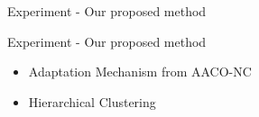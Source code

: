 \documentclass[aspectratio=169]{beamer}
\begin{document}
%          
    

\begin{frame}{Experiment - Our proposed method}
\vspace{0.15cm}
\centering

\end{frame}

\begin{frame}{Experiment - Our proposed method}
\begin{block} {}
\begin{itemize}
    \vspace{0.2cm}
    \vspace{0.2cm}
    \item Adaptation Mechanism from AACO-NC\footnotemark
    \vspace{0.2cm}
    \item Hierarchical Clustering
    \vspace{0.2cm}
\end{itemize}
\end{block}
\end{frame}
\end{document}

